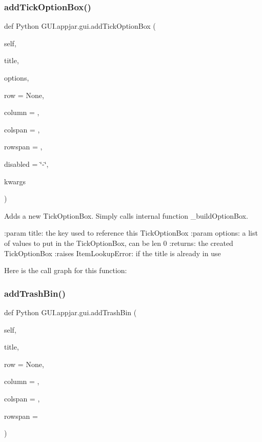 \subsubsection{\texorpdfstring{add\+Tick\+Option\+Box()}{addTickOptionBox()}}
{\footnotesize\ttfamily def Python G\+U\+I.\+appjar.\+gui.\+add\+Tick\+Option\+Box (\begin{DoxyParamCaption}\item[{}]{self,  }\item[{}]{title,  }\item[{}]{options,  }\item[{}]{row = {\ttfamily None},  }\item[{}]{column = {},  }\item[{}]{colspan = {},  }\item[{}]{rowspan = {},  }\item[{}]{disabled = {\ttfamily \char`\"{}-\/\char`\"{}},  }\item[{}]{kwargs }\end{DoxyParamCaption})}

\begin{DoxyVerb}Adds a new TickOptionBox.
Simply calls internal function _buildOptionBox.

:param title: the key used to reference this TickOptionBox
:param options: a list of values to put in the TickOptionBox, can be len 0
:returns: the created TickOptionBox
:raises ItemLookupError: if the title is already in use
\end{DoxyVerb}
 Here is the call graph for this function\+:
\mbox{\label{class_python_01_g_u_i_1_1appjar_1_1gui_aa8ec86a91c223e0c5ba3f87ba0ca2873}} 
\subsubsection{\texorpdfstring{add\+Trash\+Bin()}{addTrashBin()}}
{\footnotesize\ttfamily def Python G\+U\+I.\+appjar.\+gui.\+add\+Trash\+Bin (\begin{DoxyParamCaption}\item[{}]{self,  }\item[{}]{title,  }\item[{}]{row = {\ttfamily None},  }\item[{}]{column = {},  }\item[{}]{colspan = {},  }\item[{}]{rowspan = {} }\end{DoxyParamCaption})}



